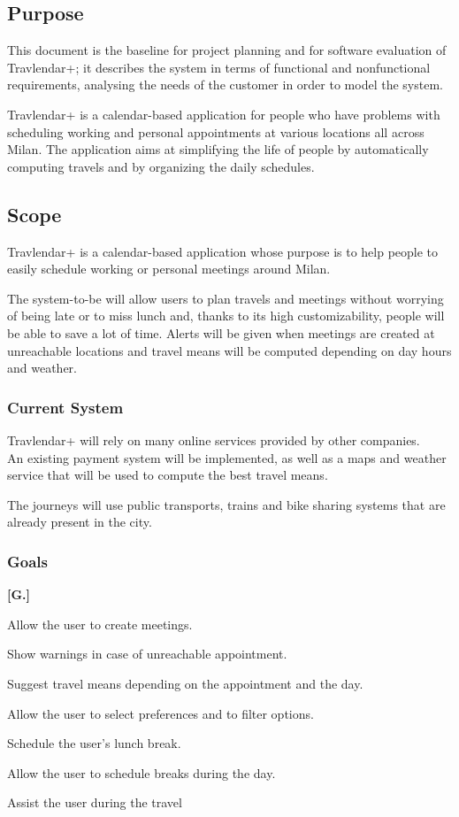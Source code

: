 \subsection{Purpose}
This document is the baseline for project planning and for software evaluation of Travlendar+; it describes the system in terms of functional and nonfunctional requirements, analysing the needs of the customer in order to model the system.

Travlendar+ is a calendar-based application for people who have problems with scheduling working and personal appointments at various locations all across Milan. The application aims at simplifying the life of people by automatically computing travels and by organizing the daily schedules.

\subsection{Scope}
Travlendar+ is a calendar-based application whose purpose is to help people to easily schedule working or personal meetings around Milan.

The system-to-be will allow users to plan travels and meetings without worrying of being late or to miss lunch and, thanks to its high customizability, people will be able to save a lot of time. Alerts will be given when meetings are created at unreachable locations and travel means will be computed depending on day hours and weather.

\subsubsection{Current System}
Travlendar+ will rely on many online services provided by other companies.\\
An existing payment system will be implemented, as well as a maps and weather service that will be used to compute the best travel means.

The journeys will use public transports, trains and bike sharing systems that are already present in the city.

\subsubsection{Goals}
\begin{list}
{\bfseries{}[G.]~}
{
}
\item
Allow the user to create meetings.
\item
Show warnings in case of unreachable appointment.
\item
Suggest travel means depending on the appointment and the day.
\item
Allow the user to select preferences and to filter options.
\item
Schedule the user’s lunch break.
\item
Allow the user to schedule breaks during the day.
\item
Assist the user during the travel

\end{list}

